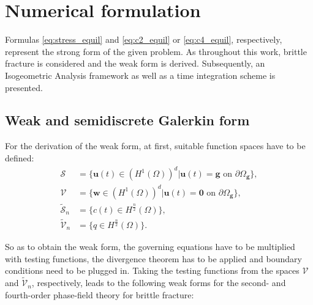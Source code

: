 \section{Numerical formulation} \label{sec:num_formul}
Formulas \eqref{eq:stress_equil} and \eqref{eq:c2_equil} or \eqref{eq:c4_equil}, respectively, represent the strong form of the given problem. As throughout this work, brittle fracture is considered and the weak form is derived. Subsequently, an Isogeometric Analysis framework as well as a time integration scheme is presented.

\subsection{Weak and semidiscrete Galerkin form} \label{sec:weak_Gal_form}
For the derivation of the weak form, at first, suitable function spaces have to be defined:
\begin{equation} \label{eq:fct_spaces}
	\begin{aligned}
		\bm{\mathcal{S}} &= \{\mathbf{u}\left(t\right)\in\left(H^{1}\left(\Omega\right)\right)^{d}|\mathbf{u}\left(t\right)=\mathbf{g} \text{ on }\partial\Omega_{\mathbf{g}}\}, \\
		\bm{\mathcal{V}} &= \{\mathbf{w}\in\left(H^{1}\left(\Omega\right)\right)^{d}|\mathbf{u}\left(t\right)=\mathbf{0} \text{ on }\partial\Omega_{\mathbf{g}}\}, \\		
		\tilde{\mathcal{S}}_{n} &= \{c\left(t\right)\in H^{\frac{n}{2}}\left(\Omega\right)\}, \\
		\tilde{\mathcal{V}}_{n} &= \{q\in H^{\frac{n}{2}}\left(\Omega\right)\}.
	\end{aligned}
\end{equation}

So as to obtain the weak form, the governing equations have to be multiplied with testing functions, the divergence theorem has to be applied and boundary conditions need to be plugged in. Taking the testing functions from the spaces $\mathbf{\mathcal{V}}$ and $\tilde{\mathcal{V}}_{n}$, respectively, leads to the following weak forms for the second- and fourth-order phase-field theory for brittle fracture:

